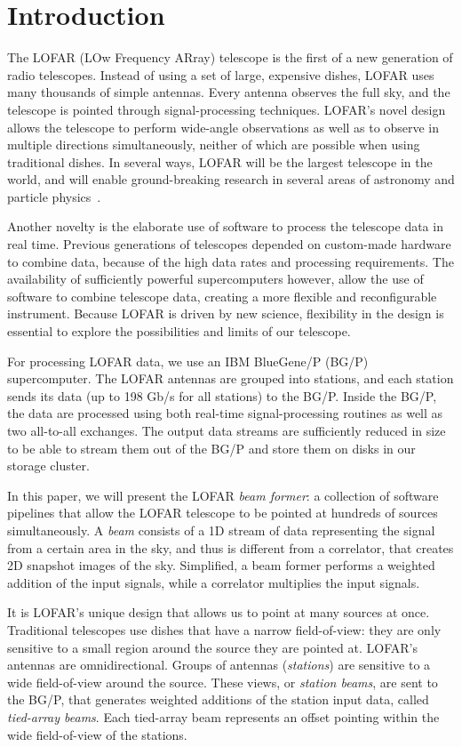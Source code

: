 \documentclass{llncs}
\begin{document}
\section{Introduction}

The LOFAR (LOw Frequency ARray) telescope is the first of a new generation of radio telescopes. Instead of using a set of large, expensive dishes, LOFAR uses many thousands of simple antennas. Every antenna observes the full sky, and the telescope is pointed through signal-processing techniques. LOFAR's novel design allows the telescope to perform wide-angle observations as well as to observe in multiple directions simultaneously, neither of which are possible when using traditional dishes. In several ways, LOFAR will be the largest telescope in the world, and will enable ground-breaking research in several areas of astronomy and particle physics~\cite{Bruyn:02}.

Another novelty is the elaborate use of software to process the telescope data in real time. Previous generations of telescopes depended on custom-made hardware to combine data, because of the high data rates and processing requirements. The availability of sufficiently powerful supercomputers however, allow the use of software to combine telescope data, creating a more flexible and reconfigurable instrument. Because LOFAR is driven by new science, flexibility in the design is essential to explore the possibilities and limits of our telescope. 

For processing LOFAR data, we use an IBM BlueGene/P (BG/P) supercomputer. The LOFAR antennas are grouped into stations, and each station sends its data (up to 198 Gb/s for all stations) to the BG/P. Inside the BG/P, the data are processed using both real-time signal-processing routines as well as two all-to-all exchanges. The output data streams are sufficiently reduced in size to be able to stream them out of the BG/P and store them on disks in our storage cluster.

In this paper, we will present the LOFAR \emph{beam former}: a collection of software pipelines that allow the LOFAR telescope to be pointed at hundreds of sources simultaneously. A \emph{beam} consists of a 1D stream of data representing the signal from a certain area in the sky, and thus is different from a correlator, that creates 2D snapshot images of the sky. Simplified, a beam former performs a weighted addition of the input signals, while a correlator multiplies the input signals.

It is LOFAR's unique design that allows us to point at many sources at once. Traditional telescopes use dishes that have a narrow field-of-view: they are only sensitive to a small region around the source they are pointed at. LOFAR's antennas are omnidirectional. Groups of antennas (\emph{stations}) are sensitive to a wide field-of-view around the source. These views, or \emph{station beams}, are sent to the BG/P, that generates weighted additions of the station input data, called \emph{tied-array beams}. Each tied-array beam represents an offset pointing within the wide field-of-view of the stations.
\end{document}
